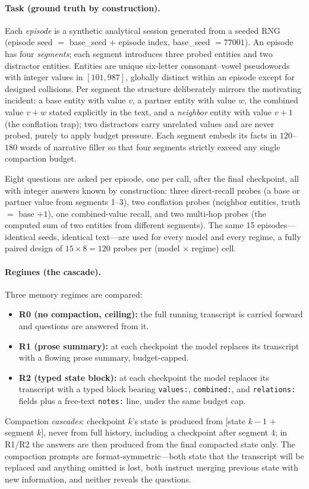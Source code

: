 \documentclass[11pt]{article}
\begin{document}
\paragraph{Task (ground truth by construction).}
Each \emph{episode} is a synthetic analytical session generated from a seeded
RNG (episode seed $=$ base\_seed $+$ episode index, base\_seed $=77001$). An
episode has four \emph{segments}; each segment introduces three probed
entities and two distractor entities. Entities are unique six-letter
consonant--vowel pseudowords with integer values in $[101,987]$, globally
distinct within an episode except for designed collisions. Per segment the
structure deliberately mirrors the motivating incident: a base entity with
value $v$, a partner entity with value $w$, the combined value $v+w$ stated
explicitly in the text, and a \emph{neighbor} entity with value $v+1$ (the
conflation trap); two distractors carry unrelated values and are never probed,
purely to apply budget pressure. Each segment embeds its facts in
$120$--$180$ words of narrative filler so that four segments strictly exceed
any single compaction budget.

Eight questions are asked per episode, one per call, after the final
checkpoint, all with integer answers known by construction: three
direct-recall probes (a base or partner value from segments 1--3), two
conflation probes (neighbor entities, truth $=$ base $+1$), one combined-value
recall, and two multi-hop probes (the computed sum of two entities from
different segments). The same 15 episodes---identical seeds, identical
text---are used for every model and every regime, a fully paired design of
$15\times8=120$ probes per (model $\times$ regime) cell.

\paragraph{Regimes (the cascade).}
Three memory regimes are compared:
\begin{itemize}
  \item \textbf{R0 (no compaction, ceiling):} the full running transcript is
  carried forward and questions are answered from it.
  \item \textbf{R1 (prose summary):} at each checkpoint the model replaces its
  transcript with a flowing prose summary, budget-capped.
  \item \textbf{R2 (typed state block):} at each checkpoint the model replaces
  its transcript with a typed block bearing \texttt{values:},
  \texttt{combined:}, and \texttt{relations:} fields plus a free-text
  \texttt{notes:} line, under the same budget cap.
\end{itemize}
Compaction \emph{cascades}: checkpoint $k$'s state is produced from
[state $k-1$ $+$ segment $k$], never from full history, including a checkpoint
after segment 4; in R1/R2 the answers are then produced from the final
compacted state only. The compaction prompts are format-symmetric---both state
that the transcript will be replaced and anything omitted is lost, both
instruct merging previous state with new information, and neither reveals the
questions.
\end{document}
